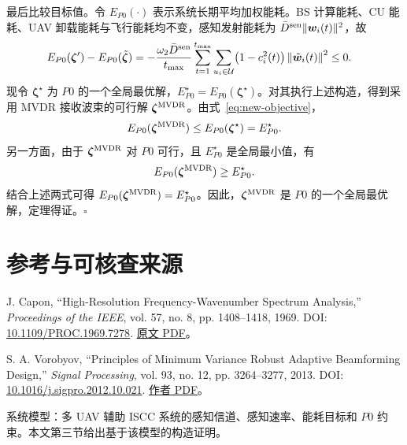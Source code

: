 \documentclass[11pt,a4paper]{ctexart}
\begin{document}
最后比较目标值。令 $E_{P0}(\cdot)$ 表示系统长期平均加权能耗。BS 计算能耗、CU 能耗、UAV 卸载能耗与飞行能耗均不变，感知发射能耗为 $\bar D^{\rm sen}\|\bm w_i(t)\|^2$，故
\begin{align}\label{eq:new-objective}
E_{P0}(\bm\zeta')-E_{P0}(\tilde{\bm\zeta})
&=-\frac{\omega_2\bar D^{\rm sen}}{t_{\max}}\sum_{t=1}^{t_{\max}}\sum_{u_i\in\mathcal U}\bigl(1-c_i^2(t)\bigr)\left\|\tilde{\bm w}_i(t)\right\|^2\le0.
\end{align}
现令 $\bm\zeta^\star$ 为 $P0$ 的一个全局最优解，$E_{P0}^\star=E_{P0}(\bm\zeta^\star)$。对其执行上述构造，得到采用 MVDR 接收波束的可行解 $\bm\zeta^{\rm MVDR}$。由式~\eqref{eq:new-objective}，
\begin{equation}\label{eq:new-opt-upper}
E_{P0}(\bm\zeta^{\rm MVDR})\le E_{P0}(\bm\zeta^\star)=E_{P0}^\star.
\end{equation}
另一方面，由于 $\bm\zeta^{\rm MVDR}$ 对 $P0$ 可行，且 $E_{P0}^\star$ 是全局最小值，有
\begin{equation}\label{eq:new-opt-lower}
E_{P0}(\bm\zeta^{\rm MVDR})\ge E_{P0}^\star.
\end{equation}
结合上述两式可得 $E_{P0}(\bm\zeta^{\rm MVDR})=E_{P0}^\star$。因此，$\bm\zeta^{\rm MVDR}$ 是 $P0$ 的一个全局最优解，定理得证。\hfill$\square$


\section*{参考与可核查来源}
\begin{enumerate}[label={[\arabic*]},leftmargin=*]
\item J. Capon, “High-Resolution Frequency-Wavenumber Spectrum Analysis,” \textit{Proceedings of the IEEE}, vol. 57, no. 8, pp. 1408--1418, 1969. DOI: \href{https://doi.org/10.1109/PROC.1969.7278}{10.1109/PROC.1969.7278}. \href{https://epsc.wustl.edu/~ggeuler/reading/cam_noise_biblio/capon_1969-ieee-high-resolution_frequency-wavenumber_spectrum_analysis.pdf}{原文 PDF}。
\item S. A. Vorobyov, “Principles of Minimum Variance Robust Adaptive Beamforming Design,” \textit{Signal Processing}, vol. 93, no. 12, pp. 3264--3277, 2013. DOI: \href{https://doi.org/10.1016/j.sigpro.2012.10.021}{10.1016/j.sigpro.2012.10.021}. \href{https://users.aalto.fi/~vorobys1/SP13.pdf}{作者 PDF}。
\item 系统模型：多 UAV 辅助 ISCC 系统的感知信道、感知速率、能耗目标和 $P0$ 约束。本文第三节给出基于该模型的构造证明。
\end{enumerate}
\clearpage
\appendix
\end{document}
